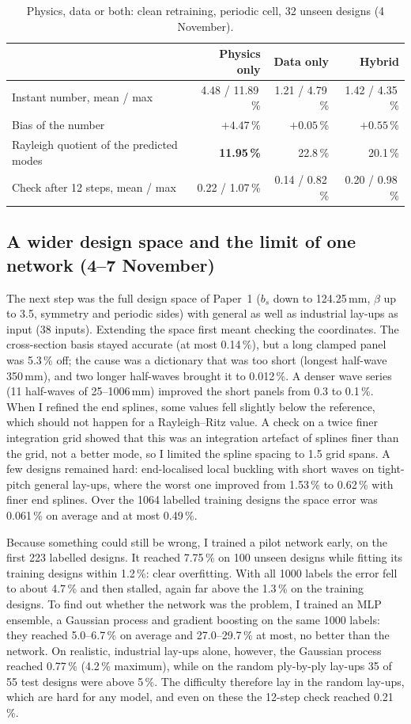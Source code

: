 \documentclass[11pt,a4paper]{article}
\newcommand{\pc}{\,\%}
\begin{document}
\begin{table}[h]
\centering\small
\caption{Physics, data or both: clean retraining, periodic cell, 32 unseen designs (4 November).}
\label{tab:loss}
\begin{tabular}{@{}lrrr@{}}
\toprule
 & Physics only & Data only & Hybrid \\
\midrule
Instant number, mean / max & 4.48 / 11.89\pc & 1.21 / 4.79\pc & 1.42 / 4.35\pc \\
Bias of the number & $+4.47$\pc & $+0.05$\pc & $+0.55$\pc \\
Rayleigh quotient of the predicted modes & \textbf{11.95\pc} & 22.8\pc & 20.1\pc \\
Check after 12 steps, mean / max & 0.22 / 1.07\pc & 0.14 / 0.82\pc & 0.20 / 0.98\pc \\
\bottomrule
\end{tabular}
\end{table}

\subsection{A wider design space and the limit of one network (4--7 November)}
The next step was the full design space of Paper~1 ($b_s$ down to 124.25\,mm, $\beta$ up to 3.5, symmetry and periodic sides) with general as well as industrial lay-ups as input (38 inputs). Extending the space first meant checking the coordinates. The cross-section basis stayed accurate (at most 0.14\pc), but a long clamped panel was 5.3\pc{} off; the cause was a dictionary that was too short (longest half-wave 350\,mm), and two longer half-waves brought it to 0.012\pc. A denser wave series (11 half-waves of 25--1006\,mm) improved the short panels from 0.3 to 0.1\pc. When I refined the end splines, some values fell slightly below the reference, which should not happen for a Rayleigh--Ritz value. A check on a twice finer integration grid showed that this was an integration artefact of splines finer than the grid, not a better mode, so I limited the spline spacing to 1.5 grid spans. A few designs remained hard: end-localised local buckling with short waves on tight-pitch general lay-ups, where the worst one improved from 1.53\pc{} to 0.62\pc{} with finer end splines. Over the 1064 labelled training designs the space error was 0.061\pc{} on average and at most 0.49\pc.

Because something could still be wrong, I trained a pilot network early, on the first 223 labelled designs. It reached 7.75\pc{} on 100 unseen designs while fitting its training designs within 1.2\pc: clear overfitting. With all 1000 labels the error fell to about 4.7\pc{} and then stalled, again far above the 1.3\pc{} on the training designs. To find out whether the network was the problem, I trained an MLP ensemble, a Gaussian process and gradient boosting on the same 1000 labels: they reached 5.0--6.7\pc{} on average and 27.0--29.7\pc{} at most, no better than the network. On realistic, industrial lay-ups alone, however, the Gaussian process reached 0.77\pc{} (4.2\pc{} maximum), while on the random ply-by-ply lay-ups 35 of 55 test designs were above 5\pc. The difficulty therefore lay in the random lay-ups, which are hard for any model, and even on these the 12-step check reached 0.21\pc.
\end{document}

